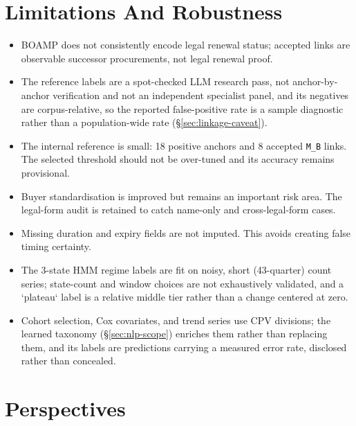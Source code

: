 \documentclass[11pt,a4paper]{article}
\newcommand{\code}[1]{\texttt{#1}}
\begin{document}
\section{Limitations And Robustness}
\begin{itemize}
\item BOAMP does not consistently encode legal renewal status; accepted links are
observable successor procurements, not legal renewal proof.
\item The reference labels are a spot-checked LLM research pass, not
anchor-by-anchor verification and not an independent specialist panel, and its
negatives are corpus-relative, so the reported false-positive rate is a
sample diagnostic rather than a population-wide rate
(\S\ref{sec:linkage-caveat}).
\item The internal reference is small: 18
positive anchors and 8 accepted \code{M\_B} links.
The selected threshold should not be over-tuned and its accuracy remains provisional.
\item Buyer standardisation is improved but remains an important risk area. The
legal-form audit is retained to catch name-only and cross-legal-form cases.
\item Missing duration and expiry fields are not imputed. This avoids creating
false timing certainty.
\item The 3-state HMM regime labels are fit on noisy, short (43-quarter) count
series; state-count and window choices are not exhaustively validated, and a
`plateau` label is a relative middle tier rather than a change centered at
zero.
\item Cohort selection, Cox covariates, and trend series use CPV divisions; the
learned taxonomy (\S\ref{sec:nlp-scope}) enriches them rather than replacing
them, and its labels are predictions carrying a measured error rate, disclosed rather
than concealed.
\end{itemize}

\section{Perspectives}
\end{document}
